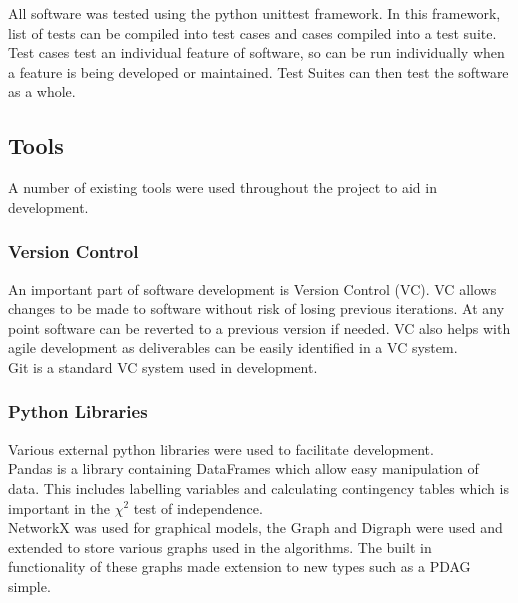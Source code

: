 \documentclass{article}
\begin{document}
All software was tested using the python unittest framework. In this framework, list of tests can be compiled into test cases and cases compiled into a test suite. Test cases test an individual feature of software, so can be run individually when a feature is being developed or maintained. Test Suites can then test the software as a whole.\\

\subsection{Tools}
A number of existing tools were used throughout the project to aid in development. 

\subsubsection{Version Control}
An important part of software development is Version Control (VC). VC allows changes to be made to software without risk of losing previous iterations. At any point software can be reverted to a previous version if needed. VC also helps with agile development as deliverables can be easily identified in a VC system.\\

Git is a standard VC system used in development.\\

\subsubsection{Python Libraries}
Various external python libraries were used to facilitate development.\\

Pandas is a library containing DataFrames which allow easy manipulation of data. This includes labelling variables and calculating contingency tables which is important in the $\chi^2$ test of independence.\\

NetworkX was used for graphical models, the Graph and Digraph were used and extended to store various graphs used in the algorithms. The built in functionality of these graphs made extension to new types such as a PDAG simple.\\
\end{document}
